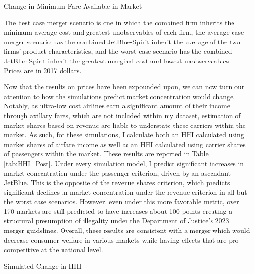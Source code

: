 \documentclass{article}
\begin{document}
    \begin{table}
        \caption{Change in Minimum Fare Available in Market}
        \label{tab:MinimumPrice}
                \vspace{-15mm}
        \begin{center}
            
        \end{center}
        \footnotesize{The best case merger scenario is one in which the combined firm inherits the minimum average cost and greatest unobservables of each firm, the average case merger scenario has the combined JetBlue-Spirit inherit the average of the two firms' product characteristics, and the worst case scenario has the combined JetBlue-Spirit inherit the greatest marginal cost and lowest unobserveables. Prices are in 2017 dollars.}
    \end{table}    

    Now that the results on prices have been expounded upon, we can now turn our attention to how the simulations predict market concentration would change. Notably, as ultra-low cost airlines earn a significant amount of their income through axillary fares, which are not included within my dataset, estimation of market shares based on revenue are liable to understate these carriers within the market. As such, for these simulations, I calculate both an HHI calculated using market shares of airfare income as well as an HHI calculated using carrier shares of passengers within the market. These results are reported in Table  \ref{tab:HHI_Post}. Under every simulation model, I predict significant increases in market concentration under the passenger criterion, driven by an ascendant JetBlue. This is the opposite of the revenue shares criterion, which predicts significant declines in market concentration under the revenue criterion in all but the worst case scenarios. However, even under this more favorable metric, over 170 markets are still predicted to have increases about 100 points creating a structural presumption of illegality under the Department of Justice's 2023 merger guidelines. Overall, these results are consistent with a merger which would decrease consumer welfare in various markets while having effects that are pro-competitive at the national level.  

      \begin{table}
        \caption{Simulated Change in HHI}
        \label{tab:HHI_Post}
        \vspace{-15mm}
        \begin{center}
        
        \end{center}
    \end{table}
\end{document}
